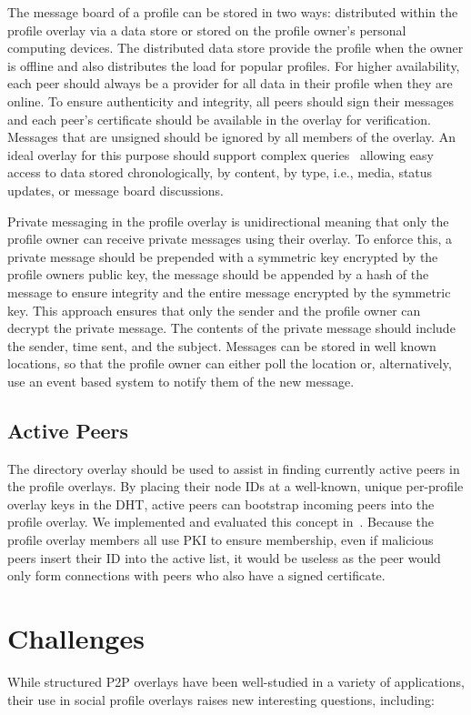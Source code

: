 The message board of a profile can be stored in two ways: distributed within the
profile overlay via a data store or stored on the profile owner's personal
computing devices.  The distributed data store provide the profile when the
owner is offline and also distributes the load for popular profiles.  For
higher availability, each peer should always be a provider for all data in their
profile when they are online.  To ensure authenticity and integrity, all peers
should sign their messages and each peer's certificate should be available in
the overlay for verification.  Messages that are unsigned should be ignored
by all members of the overlay.  An ideal overlay for this purpose should
support complex queries~\cite{complex_queries} allowing easy access to data
stored chronologically, by content, by type, i.e., media, status updates,
or message board discussions.

Private messaging in the profile overlay is unidirectional meaning that only
the profile owner can receive private messages using their overlay.  To
enforce this, a private message should be prepended with a symmetric key
encrypted by the profile owners public key, the message should be appended
by a hash of the message to ensure integrity and the entire message encrypted
by the symmetric key.  This approach ensures that only the sender and the
profile owner can decrypt the private message.  The contents of the private
message should include the sender, time sent, and the subject.  Messages can
be stored in well known locations, so that the profile owner can either poll
the location or, alternatively, use an event based system to notify them of
the new message.

\subsection{Active Peers}
The directory overlay should be used to assist in finding currently active peers
in the profile overlays.  By placing their node IDs at a well-known, unique
per-profile overlay keys in the DHT, active peers can bootstrap incoming peers
into the profile overlay.  We implemented and evaluated this concept
in~\cite{icdcs10}.  Because the profile overlay members all use PKI to ensure
membership, even if malicious peers insert their ID into the active list, it
would be useless as the peer would only form connections with peers who also
have a signed certificate.

\section{Challenges}
\label{outstanding}
While structured P2P overlays have been well-studied in a variety of applications,
their use in social profile overlays raises new interesting questions, including:

